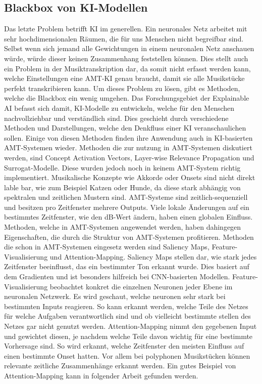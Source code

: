 \subsection{Blackbox von KI-Modellen}
Das letzte Problem betrifft KI im generellen.
Ein neuronales Netz arbeitet mit sehr hochdimensionalen Räumen, die für uns Menschen nicht begreifbar sind.
Selbst wenn sich jemand alle Gewichtungen in einem neuronalen Netz anschauen würde,
würde dieser keinen Zusammenhang feststellen können.
Dies stellt auch ein Problem in der Musiktranskription dar, da somit nicht erfasst werden kann,
welche Einstellungen eine AMT-KI genau braucht,
damit sie alle Musikstücke perfekt transkribieren kann.
Um dieses Problem zu lösen, gibt es Methoden, welche die Blackbox ein wenig umgehen.
Das Forschungsgebiet der Explainable AI befasst sich damit,
KI-Modelle zu entwickeln, welche für den Menschen nachvollziehbar und verständlich sind.
Dies geschieht durch verschiedene Methoden und Darstellungen, welche den Denkfluss einer KI veranschaulichen sollen.
Einige von diesen Methoden finden ihre Anwendung auch in KI-basierten AMT-Systemen wieder.
Methoden die zur nutzung in AMT-Systemen diskutiert werden, sind Concept Activation Vectors,
Layer-wise Relevance Propagation und Surrogat-Modelle.
Diese wurden jedoch noch in keinem AMT-System richtig implementiert.
Musikalische Konzepte wie Akkorde oder Onsets sind nicht direkt lable bar, wie zum Beispiel Katzen oder Hunde,
da diese stark abhängig von spektralen und zeitlichen Mustern sind.
AMT-Systeme sind zeitlich-sequenziell und besitzen pro Zeitfenster mehrere Outputs.
Viele lokale Änderungen auf ein bestimmtes Zeitfenster, wie den dB-Wert ändern, haben einen globalen Einfluss.
Methoden, welche in AMT-Systemen angewendet werden,
haben dahingegen Eigenschaften, die durch die Struktur von AMT-Systemen profitieren.
Methoden die schon in AMT-Systemen eingesetz werden sind Saliency Maps, Feature-Visualisierung und Attention-Mapping.
Saliency Maps stellen dar, wie stark jedes Zeitfenster beeinflusst, das ein bestimmter Ton erkannt wurde.
Dies basiert auf dem Gradienten und ist besonders hilfreich bei CNN-basierten Modellen.
Feature-Visualisierung beobachtet konkret die einzelnen Neuronen jeder Ebene im neuronalen Netzwerk.
Es wird geschaut, welche neuronen sehr stark bei bestimmten Inputs reagieren.
So kann erkannt werden, welche Teile des Netzes für welche Aufgaben verantwortlich sind
und ob vielleicht bestimmte stellen des Netzes gar nicht genutzt werden.
Attention-Mapping nimmt den gegebenen Input und gewichtet diesen,
je nachdem welche Teile davon wichtig für eine bestimmte Vorhersage sind.
So wird erkannt, welche Zeitfenster den meisten Einfluss auf einen bestimmte Onset hatten.
Vor allem bei polyphonen Musikstücken können relevante zeitliche Zusammenhänge erkannt werden.
Ein gutes Beispiel von Attention-Mapping kann in folgender Arbeit gefunden werden.
\cite{cheuk2021revisiting}

